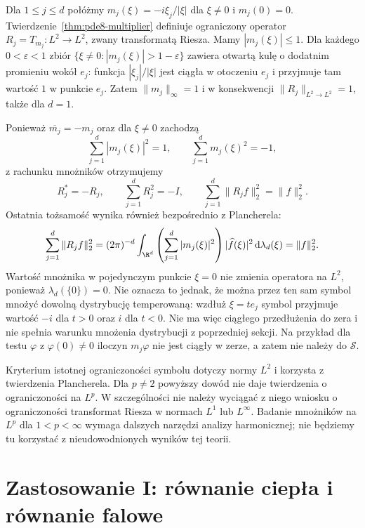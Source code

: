 \begin{przyklad}
Dla $1\le j\le d$ połóżmy
$m_j(\xi)=-i\xi_j/|\xi|$ dla $\xi\ne0$ i $m_j(0)=0$.
Twierdzenie~\ref{thm:pde8-multiplier} definiuje
ograniczony operator $R_j=T_{m_j}:L^2\to L^2$,
zwany transformatą Riesza.
Mamy $|m_j(\xi)|\le1$. Dla każdego
$0<\varepsilon<1$ zbiór
$\{\xi\ne0:|m_j(\xi)|>1-\varepsilon\}$
zawiera otwartą kulę o dodatnim promieniu
wokół $e_j$: funkcja $|\xi_j|/|\xi|$ jest
ciągła w otoczeniu $e_j$ i przyjmuje tam
wartość $1$ w punkcie $e_j$.
Zatem $\|m_j\|_\infty=1$ i w konsekwencji
$\|R_j\|_{L^2\to L^2}=1$, także dla $d=1$.

Ponieważ $\overline{m_j}=-m_j$ oraz dla
$\xi\ne0$ zachodzą
\[
 \sum_{j=1}^d |m_j(\xi)|^2=1,\qquad
 \sum_{j=1}^d m_j(\xi)^2=-1,
\]
z rachunku mnożników otrzymujemy
\[
 R_j^*=-R_j,\qquad
 \sum_{j=1}^d R_j^2=-I,\qquad
 \sum_{j=1}^d\|R_j f\|_2^2=\|f\|_2^2.
\]
Ostatnia tożsamość wynika również bezpośrednio
z Plancherela:
\[
 \sum_{j=1}^d\|R_j f\|_2^2
 =(2\pi)^{-d}\int_{\R^d}
 \left(\sum_{j=1}^d|m_j(\xi)|^2\right)
 |\widehat f(\xi)|^2\,\mathrm d\lambda_d(\xi)
 =\|f\|_2^2.
\]
Wartość mnożnika w pojedynczym punkcie $\xi=0$
nie zmienia operatora na $L^2$, ponieważ
$\lambda_d(\{0\})=0$. Nie oznacza to jednak,
że można przez ten sam symbol mnożyć dowolną
dystrybucję temperowaną: wzdłuż $\xi=te_j$
symbol przyjmuje wartość $-i$ dla $t>0$
oraz $i$ dla $t<0$. Nie ma więc ciągłego
przedłużenia do zera i nie spełnia warunku
mnożenia dystrybucji z poprzedniej sekcji.
Na przykład dla testu $\varphi$ z $\varphi(0)\ne0$
iloczyn $m_j\varphi$ nie jest ciągły w zerze,
a zatem nie należy do $\mathcal S$.
\end{przyklad}

\begin{uwaga}
Kryterium istotnej ograniczoności symbolu
dotyczy normy $L^2$ i korzysta z twierdzenia
Plancherela. Dla $p\ne2$ powyższy dowód
nie daje twierdzenia o ograniczoności
na $L^p$. W szczególności nie należy
wyciągać z niego wniosku o ograniczoności
transformat Riesza w normach $L^1$ lub
$L^\infty$. Badanie mnożników na $L^p$
dla $1<p<\infty$ wymaga dalszych narzędzi
analizy harmonicznej; nie będziemy tu
korzystać z nieudowodnionych wyników tej teorii.
\end{uwaga}

\section{Zastosowanie I: równanie ciepła i równanie falowe}
\label{sec:pde8-evolution}

